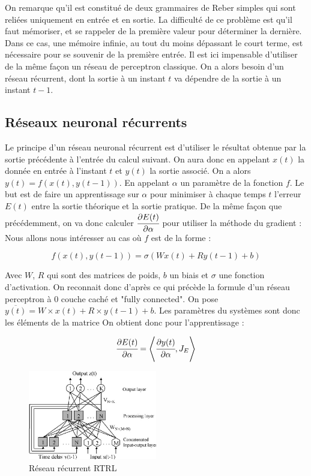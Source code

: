 On remarque qu'il est constitué de deux grammaires de Reber simples qui sont reliées uniquement en entrée et en sortie.
La difficulté de ce problème est qu'il faut mémoriser, et se rappeler de la première valeur pour déterminer la dernière.
Dans ce cas, une mémoire infinie, au tout du moins dépassant le court terme, est nécessaire pour se souvenir de la première entrée.
Il est ici impensable d'utiliser de la même façon un réseau de perceptron classique. On a alors besoin d'un réseau récurrent, dont la sortie à un instant $t$ va dépendre de la sortie à un instant $t-1$.

\subsection{Réseaux neuronal récurrents}

Le principe d'un réseau neuronal récurrent est d'utiliser le résultat obtenue par la sortie précédente à l'entrée du calcul suivant.
On aura donc en appelant $x(t)$ la donnée en entrée à l'instant $t$ et $y(t)$ la sortie associé.
On a alors $y(t) = f(x(t), y(t-1))$.
En appelant $\alpha$ un paramètre de la fonction $f$.
Le but est de faire un apprentissage sur $\alpha$ pour minimiser à chaque temps $t$ l'erreur $E(t)$ entre la sortie théorique et la sortie pratique.
De la même façon que précédemment, on va donc calculer $\cfrac{\partial E(t)}{\partial \alpha}$ pour utiliser la méthode du gradient :
Nous allons nous intéresser au cas où $f$ est de la forme :

\[ f(x(t), y(t-1)) = \sigma\left (W x(t) + R y(t-1) + b\right )\]

Avec $W$, $R$ qui sont des matrices de poids, $b$ un biais et $\sigma$ une fonction d'activation.
On reconnait donc d'après ce qui précède la formule d'un réseau perceptron à $0$ couche caché et "fully connected".
On pose $\overline{y(t)} = W\times x(t) + R\times y(t-1) + b$.
Les paramètres du systèmes sont donc les éléments de la matrice
On obtient donc pour l'apprentissage :

\[\cfrac{\partial E(t)}{\partial \alpha} = \left\langle \cfrac{\partial y(t)}{\partial \alpha}, J_E \right\rangle\]

\begin{figure}[!ht]
\begin{center}
  \includegraphics[width=0.5\textwidth]{images/rtrl.png}
\end{center}
\caption{Réseau récurrent RTRL}
\end{figure}


